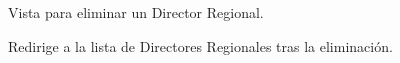\documentclass[letterpaper,10pt,spanish]{sphinxmanual}
\begin{document}
\begin{fulllineitems}

\pysigstartsignatures
{}
\pysigstopsignatures
\sphinxAtStartPar
Vista para eliminar un Director Regional.

\sphinxAtStartPar
Redirige a la lista de Directores Regionales tras la eliminación.


\begin{fulllineitems}

\pysigstartsignatures
{}
\pysigstopsignatures
\end{fulllineitems}


\end{fulllineitems}
\end{document}
